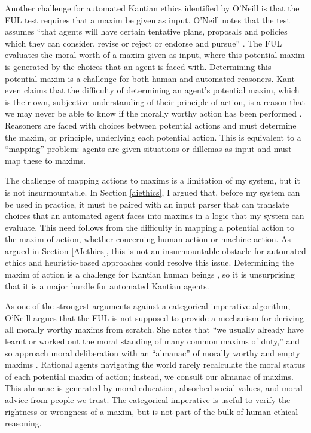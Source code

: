 \begin{isabellebody}
\begin{isamarkuptext}
Another challenge for automated Kantian ethics identified by O'Neill is that the FUL test requires that
a maxim be given as input. O'Neill notes that the test assumes ``that agents will have certain tentative 
plans, proposals and policies which they can consider, revise or reject or endorse and pursue'' \citep[343]{oneilluniversallaws}.
The FUL evaluates the moral worth of a maxim given as input, where this potential maxim is generated by 
the choices that an agent is faced with. Determining this potential maxim is a challenge for both human
and automated reasoners. Kant even claims that the difficulty of determining an agent's potential maxim, which is their
own, subjective understanding of their principle of action, is a reason that we may never be able 
to know if the morally worthy action has been performed \cite[345]{oneilluniversallaws}. Reasoners are faced with
choices between potential actions and must determine the maxim, or principle, underlying each potential action.
This is equivalent to a ``mapping'' problem: agents are given situations or dillemas as input and must map
these to maxims.

The challenge of mapping actions to maxims is a limitation of my system, but it is not insurmountable. In Section \ref{aiethics},
I argued that, before my system can be used in practice, it must be paired with an input parser that can
translate choices that an automated agent faces into maxims in a logic that my system can
evaluate. This need follows from the difficulty in mapping a potential action
to the maxim of action, whether concerning human action or machine action. As argued in Section \ref{AIethics},  
this is not an insurmountable obstacle for automated ethics and heuristic-based approaches could resolve
this issue. Determining the maxim of action is a challenge for Kantian human beings \citep{oneilluniversallaws}, 
so it is unsurprising that it is a major hurdle for automated Kantian agents. 

As one of the strongest arguments against a categorical imperative algorithm, O'Neill argues that 
the FUL is not supposed to provide a mechanism for deriving all morally worthy maxims from scratch. She notes
that ``we usually already have learnt or worked out the moral standing of many common maxims of duty,''
and so approach moral deliberation with an ``almanac'' of morally worthy and empty maxims \citep[394]{oneilluniversallaws}. 
Rational agents navigating the world rarely recalculate the moral status of each potential maxim of 
action; instead, we consult our almanac of maxims. This almanac is generated by moral education, 
absorbed social values, and moral advice from people we trust. The categorical imperative is useful 
to verify the rightness or wrongness of a maxim, but is not part of the bulk of human ethical reasoning.


\end{isamarkuptext}
\end{isabellebody}
